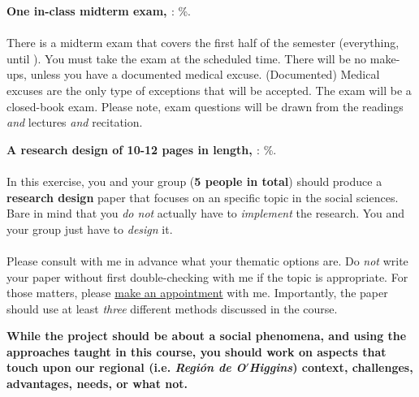 \documentclass[letterpaper]{article}
\renewenvironment{itemize}{
  \begin{list}{}{
    \setlength{\leftmargin}{1.5em}
  }
}{
  \end{list}
}
\begin{document}
\begin{enumerate}
	\item {\bf One in-class midterm exam, \underline{{\unskip}}}: {\unskip}\%.
	\\ 
	\\
	There is a midterm exam that covers the first half of the semester (everything, until {\unskip}). You must take the exam at the scheduled time. There will be no make-ups, unless you have a documented medical excuse. (Documented) Medical excuses are the only type of exceptions that will be accepted. The exam will be a closed-book exam. Please note, exam questions will be drawn from the readings \emph{and} lectures \emph{and} recitation.


	\item {\bf A research design of 10-12 pages in length, \underline{{\unskip}}}: {\unskip}\%.
	\\ 
	\\
	In this exercise, you and your group ({\bf 5 people in total}) should produce a {\bf research design} paper that focuses on an specific topic in the social sciences. Bare in mind that you \emph{do not} actually have to \emph{implement} the research. You and your group just have to \emph{design} it.
	\\
	\\
	Please consult with me in advance what your thematic options are. Do \emph{not} write your paper without first double-checking with me if the topic is appropriate. For those matters, please \href{https://calendly.com/bahamonde/officehours}{make an appointment} with me. Importantly, the paper should use at least \emph{three} different methods discussed in the course.

	\begin{itemize}
	\item[\Pointinghand] {\bf While the project should be about a social phenomena, and using the approaches taught in this course, {\color{blue}you should work on aspects that touch upon our regional} (i.e. \emph{Regi\'on de O$'$Higgins}) {\color{blue}context, challenges, advantages, needs, or what not.}}
	\end{itemize}


\end{enumerate}
\end{document}
